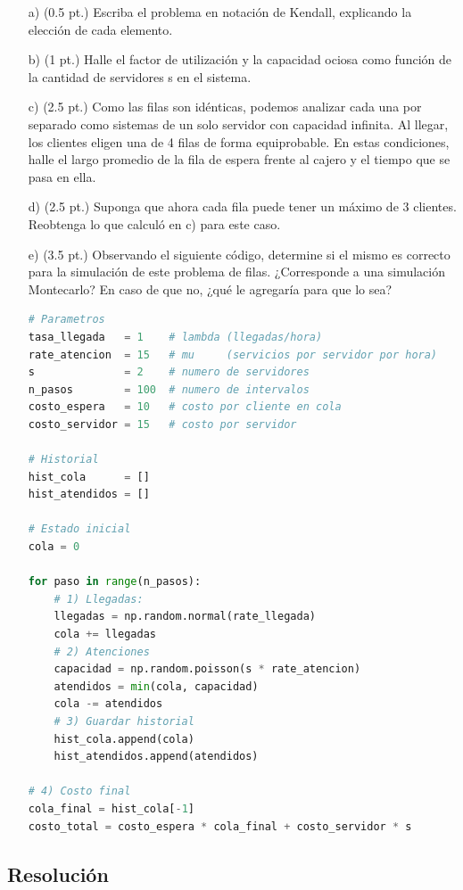 \documentclass[12pt]{article}
\begin{document}
\begin{itemize}
    \item[a)] (0.5 pt.) Escriba el problema en notación de Kendall, explicando la elección de cada elemento.
    \item[b)] (1 pt.) Halle el factor de utilización y la capacidad ociosa como función de la cantidad de servidores s en el sistema.
    \item[c)] (2.5 pt.) Como las filas son idénticas, podemos analizar cada una por separado como sistemas de un solo servidor con capacidad infinita. Al llegar, los clientes eligen una de 4 filas de forma equiprobable. En estas condiciones, halle el largo promedio de la fila de espera frente al cajero y el tiempo que se pasa en ella.
    \item[d)] (2.5 pt.) Suponga que ahora cada fila puede tener un máximo de 3 clientes. Reobtenga lo que calculó en c) para este caso.
    \item[e)] (3.5 pt.) Observando el siguiente código, determine si el mismo es correcto para la simulación de este problema de filas. ¿Corresponde a una simulación Montecarlo? En caso de que no, ¿qué le agregaría para que lo sea?

\begin{lstlisting}[language=Python]
# Parametros
tasa_llegada   = 1    # lambda (llegadas/hora)
rate_atencion  = 15   # mu     (servicios por servidor por hora)
s              = 2    # numero de servidores
n_pasos        = 100  # numero de intervalos
costo_espera   = 10   # costo por cliente en cola
costo_servidor = 15   # costo por servidor

# Historial
hist_cola      = []
hist_atendidos = []

# Estado inicial
cola = 0

for paso in range(n_pasos):
    # 1) Llegadas:
    llegadas = np.random.normal(rate_llegada)
    cola += llegadas
    # 2) Atenciones
    capacidad = np.random.poisson(s * rate_atencion)
    atendidos = min(cola, capacidad)
    cola -= atendidos
    # 3) Guardar historial
    hist_cola.append(cola)
    hist_atendidos.append(atendidos)

# 4) Costo final
cola_final = hist_cola[-1]
costo_total = costo_espera * cola_final + costo_servidor * s
\end{lstlisting}
\end{itemize}

\subsection{Resolución}
\end{document}
